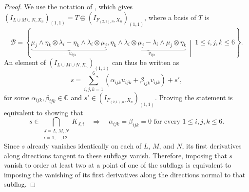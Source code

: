 \documentclass[a4paper,reqno]{amsart}
\theoremstyle{plainnopunct}
\theoremstyle{definitionnopunct}
\newcommand{\C}{\mathbb{C}}
\begin{document}
\begin{proof}
We use the notation of , which gives
$
\left(
I_{L\cup M\cup N,X_n}
\right)_{(1,1)}
=
T
\oplus
\left(
I_{F_{(2,1),n},X_n}
\right)_{(1,1)}$,
where a basis of $T$ is
$$
\mathcal B
=
\left\{
\underbrace{
\mu_j\wedge\eta_k\otimes\lambda_i
-
\eta_k\wedge\lambda_i\otimes\mu_j
}_{\coloneq u_{ijk}},
\underbrace{
\eta_k\wedge\lambda_i\otimes\mu_j
-
\lambda_i\wedge\mu_j\otimes\eta_k
}_{\coloneq v_{ijk}}
\ \middle|\
1\leq i,j,k\leq6
\right\}.
$$
An element of
$\left(I_{L\cup M\cup N,X_n}\right)_{(1,1)}$
can thus be written as
$$
s
=
\sum_{i,j,k=1}^6
\left(
\alpha_{ijk}u_{ijk}
+
\beta_{ijk}v_{ijk}
\right)
+
s',
$$
for some $\alpha_{ijk},\beta_{ijk}\in\C$ and
$s'\in\left(I_{F_{(2,1),n},X_n}\right)_{(1,1)}$.
Proving the statement is equivalent to showing that
\[
s
\in
\bigcap_{\substack{J=L,M,N\\ i=1,\ldots,12}}
K_{J,i}
\quad\Longrightarrow\quad
\alpha_{ijk}
=
\beta_{ijk}
=
0
\text{ for every }1\leq i,j,k\leq6.
\]
Since $s$ already vanishes identically on each of $L$, $M$, and $N$,
its first derivatives along directions tangent to these subflags
vanish. Therefore, imposing that $s$ vanish to order at least two at a
point of one of the subflags is equivalent to imposing the vanishing
of its first derivatives along the directions normal to that subflag.


\end{proof}
\end{document}
